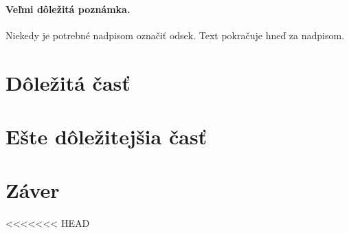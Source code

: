 \documentclass[10pt,oneside,slovak,a4paper]{article}
\begin{document}
\paragraph{Veľmi dôležitá poznámka.}
Niekedy je potrebné nadpisom označiť odsek. Text pokračuje hneď za nadpisom.



\section{Dôležitá časť} \label{dolezita}




\section{Ešte dôležitejšia časť} \label{dolezitejsia}




\section{Záver} \label{zaver} %






<<<<<<< HEAD
\end{document}
